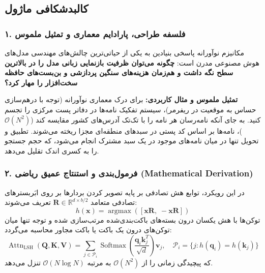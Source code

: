 \subsection{کالبدشکافی ماژول }

\subsubsection*{۱. فلسفه طراحی، پارادایم معماری و تمثیل ملموس}
مکانیزم نوآورانه  پاسخی بنیادین به یکی از حیاتی‌ترین چالش‌های مهندسی مدل‌های هوش مصنوعی مدرن است: \textbf{چگونه می‌توان ظرفیت بازنمایی زبانی مدل را در بالاترین سطح نگه داشت و هم‌زمان هزینه‌های سنگین پردازشی و بن‌بست‌های حافظه سخت‌افزار را مهار کرد؟}

\textbf{تمثیل ملموس و مثال کاربردی:}
برای درک معماری نوآورانه  (توجه با درهم‌سازی حساس به موقعیت در ریفرمر)، سیستم تفکیک نامه‌ها در دفاتر پست مرکزی را تجسم کنید. به جای آنکه نامه‌رسان هر نامه را با تک‌تک آدرس‌های کشور مقایسه کند ($\mathcal{O}(N^2)$)، نامه‌ها بر اساس کد پستی در سبدهای منطقه‌ای مجزا ریخته می‌شوند. تطبیق و تحویل تنها در میان نامه‌های موجود در یک سبد مشترک انجام می‌شود، که حجم جستجو را به کسری اندک تقلیل می‌دهد.

\subsubsection*{۲. فرمول‌بندی و استنتاج عمیق ریاضی (Mathematical Derivation)}
در این رویکرد، توابع هش تصادفی بر پایه تصویر کردن بردارها بر روی ابَربسترهای تصادفی متعامد $\mathbf{R} \in \mathbb{R}^{d \times b/2}$ تعریف می‌شوند:
\begin{equation}
h(\mathbf{x}) = \operatorname{argmax}\left( [\mathbf{x}\mathbf{R}, \; -\mathbf{x}\mathbf{R}] \right)
\end{equation}
توکن‌ها با هش یکسان درون بسته‌های باکت‌بندی‌شده مرتب‌سازی شده و توجه تنها میان توکن‌های درون یک باکت یا باکت مجاور محاسبه می‌گردد:
\begin{equation}
\operatorname{Attn}_{\text{LSH}}(\mathbf{Q}, \mathbf{K}, \mathbf{V}) = \sum_{j \in \mathcal{P}_i} \operatorname{Softmax}\left(\frac{\mathbf{q}_i \mathbf{k}_j^T}{\sqrt{d}}\right) \mathbf{v}_j, \quad \mathcal{P}_i = \{j: h(\mathbf{q}_i) = h(\mathbf{k}_j)\}
\end{equation}
که پیچیدگی زمانی را از $\mathcal{O}(N^2)$ به مرتبه $\mathcal{O}(N \log N)$ تنزل می‌دهد.

